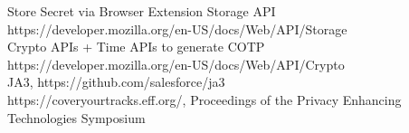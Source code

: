 \documentclass[a4paper, 11pt]{article} 				%
\begin{document}
\noindent
Store Secret via Browser Extension Storage API\\
https://developer.mozilla.org/en-US/docs/Web/API/Storage\\

\noindent
Crypto APIs + Time APIs to generate COTP\\
https://developer.mozilla.org/en-US/docs/Web/API/Crypto\\


\noindent
JA3, https://github.com/salesforce/ja3\\

\noindent
https://coveryourtracks.eff.org/, Proceedings of the Privacy Enhancing Technologies Symposium

\end{document}

